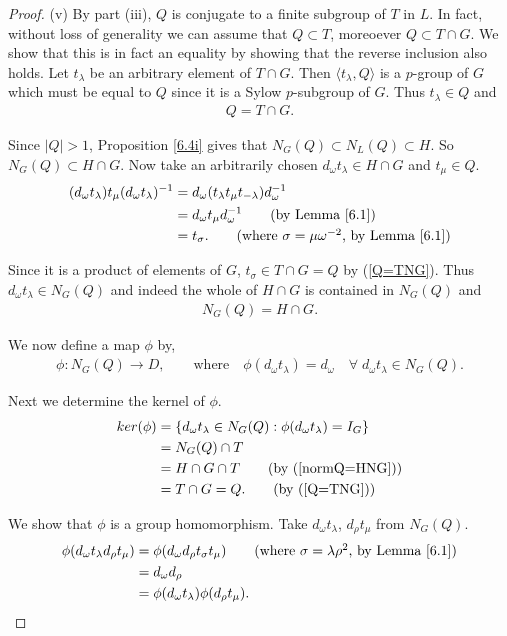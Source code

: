 \begin{proof}
(v) By part (iii), $Q$ is conjugate to a finite subgroup of $T$ in $L$. In fact, without loss of generality we can assume that $Q \subset T$, moreoever $Q \subset T \cap G$. We show that this is in fact an equality by showing that the reverse inclusion also holds. Let $t_\lambda$ be an arbitrary element of $T \cap G$. Then $\langle t_\lambda, Q \rangle$ is a $p$-group of $G$ which must be equal to $Q$ since it is a Sylow $p$-subgroup of $G$. Thus $t_\lambda \in Q$ and
\begin{align}\label{Q=TNG} Q = T \cap G.
\end{align}

Since $|Q| > 1$, Proposition \ref{6.4i} gives that $N_G(Q) \subset N_L(Q) \subset H$. So $N_G(Q) \subset H \cap G$. Now take an arbitrarily chosen $d_\omega t_\lambda \in H \cap G$ and $t_\mu \in Q$.
\begin{align*} (d_\omega t_\lambda) t_\mu (d_\omega t_\lambda)^{-1} &= d_\omega ( t_\lambda t_\mu  t_{-\lambda}) d^{-1}_\omega
\\ &=  d_\omega t_\mu d^{-1}_\omega \tag{by Lemma \ref{6.1}}
\\ &= t_\sigma. \tag{where $\sigma = \mu \omega^{-2}$, by Lemma \ref{6.1}}
\end{align*}

Since it is a product of elements of $G$, $t_\sigma \in T \cap G = Q$ by (\ref{Q=TNG}). Thus $d_\omega t_\lambda \in N_G(Q)$ and indeed the whole of $H \cap G$ is contained in $N_G(Q)$ and
\begin{align}\label{normQ=HNG} N_G(Q) = H \cap G.
\end{align}

We now define a map $\phi$ by,
\begin{align*} \phi : N_G(Q) \longrightarrow D, \qquad \text{where} \quad \! \phi(d_\omega t_\lambda) = d_\omega \quad \forall \; d_\omega t_\lambda \in N_G(Q).
\end{align*}

Next we determine the kernel of $\phi$.
\begin{align*} ker(\phi) &= \{ d_\omega t_\lambda \in N_G(Q) : \phi(d_\omega t_\lambda) = I_G \}
\\ &= N_G(Q) \cap T
\\ &= H \cap G \cap T \tag{by (\ref{normQ=HNG})}
\\ &= T \cap G = Q. \tag{by (\ref{Q=TNG})}
\end{align*}

We show that $\phi$ is a group homomorphism. Take $d_\omega t_\lambda$, $d_\rho t_\mu$ from $ N_G(Q)$.
\begin{align*} \phi(d_\omega t_\lambda d_\rho t_\mu) &= \phi(d_\omega d_\rho t_\sigma t_\mu) \tag{where $\sigma = \lambda \rho^2$, by Lemma \ref{6.1}}
\\ &= d_\omega d_\rho
\\ &= \phi(d_\omega t_\lambda) \phi(d_\rho t_\mu).
\end{align*}


\end{proof}
